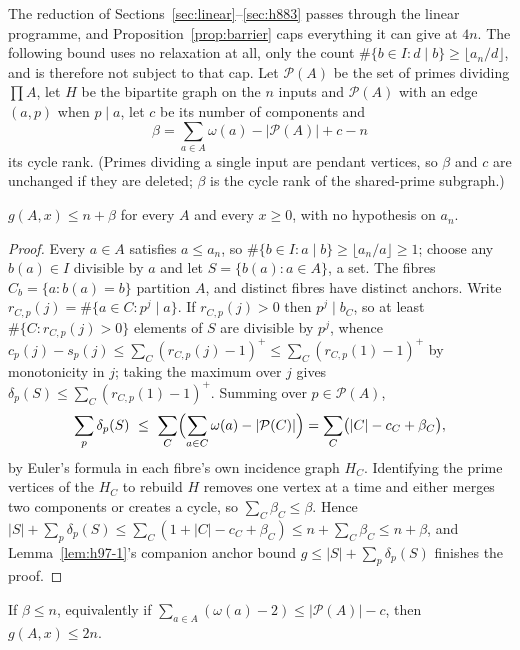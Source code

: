 The reduction of Sections~\ref{sec:linear}--\ref{sec:h883} passes through the linear programme, and
Proposition~\ref{prop:barrier} caps everything it can give at $4n$. The following bound uses no
relaxation at all, only the count $\#\{b\in I:d\mid b\}\ge\lfloor a_n/d\rfloor$, and is therefore not
subject to that cap. Let $\mathcal P(A)$ be the set of primes dividing $\prod A$, let $H$ be the
bipartite graph on the $n$ inputs and $\mathcal P(A)$ with an edge $(a,p)$ when $p\mid a$, let $c$ be
its number of components and
\[
\beta=\sum_{a\in A}\omega(a)-\bigl|\mathcal P(A)\bigr|+c-n
\]
its cycle rank. (Primes dividing a single input are pendant vertices, so $\beta$ and $c$ are unchanged
if they are deleted; $\beta$ is the cycle rank of the shared-prime subgraph.)

\begin{theorem}\label{thm:incidence}
$g(A,x)\le n+\beta$ for every $A$ and every $x\ge0$, with no hypothesis on $a_n$.
\end{theorem}
\begin{proof}
Every $a\in A$ satisfies $a\le a_n$, so $\#\{b\in I:a\mid b\}\ge\lfloor a_n/a\rfloor\ge1$; choose any
$b(a)\in I$ divisible by $a$ and let $S=\{b(a):a\in A\}$, a set. The fibres $C_b=\{a:b(a)=b\}$
partition $A$, and distinct fibres have distinct anchors. Write $r_{C,p}(j)=\#\{a\in C:p^j\mid a\}$.
If $r_{C,p}(j)>0$ then $p^j\mid b_C$, so at least $\#\{C:r_{C,p}(j)>0\}$ elements of $S$ are divisible
by $p^j$, whence $c_p(j)-s_p(j)\le\sum_C(r_{C,p}(j)-1)^+\le\sum_C(r_{C,p}(1)-1)^+$ by monotonicity in
$j$; taking the maximum over $j$ gives $\delta_p(S)\le\sum_C(r_{C,p}(1)-1)^+$. Summing over
$p\in\mathcal P(A)$,
\[
\sum_p\delta_p(S)\ \le\ \sum_C\Bigl(\sum_{a\in C}\omega(a)-|\mathcal P(C)|\Bigr)
=\sum_C\bigl(|C|-c_C+\beta_C\bigr),
\]
by Euler's formula in each fibre's own incidence graph $H_C$. Identifying the prime vertices of the
$H_C$ to rebuild $H$ removes one vertex at a time and either merges two components or creates a
cycle, so $\sum_C\beta_C\le\beta$. Hence
$|S|+\sum_p\delta_p(S)\le\sum_C(1+|C|-c_C+\beta_C)\le n+\sum_C\beta_C\le n+\beta$, and
Lemma~\ref{lem:h97-1}'s companion anchor bound $g\le|S|+\sum_p\delta_p(S)$ finishes the proof.
\end{proof}

\begin{corollary}\label{cor:betan}
If $\beta\le n$, equivalently if $\sum_{a\in A}(\omega(a)-2)\le|\mathcal P(A)|-c$, then
$g(A,x)\le2n$.
\end{corollary}

